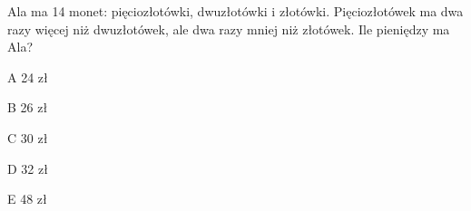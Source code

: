 \begin{tresc}
Ala ma 14 monet: pięciozłotówki, dwuzłotówki i złotówki. Pięciozłotówek ma dwa razy więcej niż dwuzłotówek, ale dwa razy mniej niż złotówek. Ile pieniędzy ma Ala?
\end{tresc}
\begin{wariant}{A} 24 zł \end{wariant}
\begin{wariant}{B} 26 zł \end{wariant}
\begin{wariant}{C} 30 zł \end{wariant}
\begin{wariant}{D} 32 zł \end{wariant}
\begin{wariant}{E} 48 zł \end{wariant}
